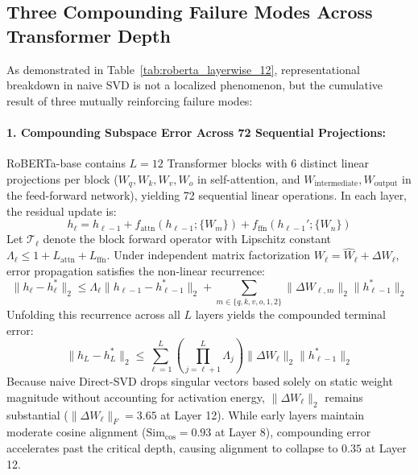 \documentclass{article}
\begin{document}
\subsection{Three Compounding Failure Modes Across Transformer Depth}
As demonstrated in Table~\ref{tab:roberta_layerwise_12}, representational breakdown in naive SVD is not a localized phenomenon, but the cumulative result of three mutually reinforcing failure modes:

\paragraph{1. Compounding Subspace Error Across 72 Sequential Projections:}
RoBERTa-base contains $L = 12$ Transformer blocks with 6 distinct linear projections per block ($W_q, W_k, W_v, W_o$ in self-attention, and $W_{\text{intermediate}}, W_{\text{output}}$ in the feed-forward network), yielding 72 sequential linear operations. In each layer, the residual update is:
\begin{equation}
    h_\ell = h_{\ell-1} + f_{\text{attn}}(h_{\ell-1}; \{W_m\}) + f_{\text{ffn}}(h_{\ell-1}'; \{W_n\})
\end{equation}
Let $\mathcal{T}_\ell$ denote the block forward operator with Lipschitz constant $\Lambda_\ell \le 1 + L_{\text{attn}} + L_{\text{ffn}}$. Under independent matrix factorization $W_\ell = \hat{W}_\ell + \Delta W_\ell$, error propagation satisfies the non-linear recurrence:
\begin{equation}
    \|h_\ell - h_\ell^*\|_2 \le \Lambda_\ell \|h_{\ell-1} - h_{\ell-1}^*\|_2 + \sum_{m \in \{q,k,v,o,1,2\}} \|\Delta W_{\ell, m}\|_2 \|h_{\ell-1}^*\|_2
\end{equation}
Unfolding this recurrence across all $L$ layers yields the compounded terminal error:
\begin{equation}
    \|h_L - h_L^*\|_2 \le \sum_{\ell=1}^L \left(\prod_{j=\ell+1}^L \Lambda_j\right) \|\Delta W_\ell\|_2 \|h_{\ell-1}^*\|_2
\end{equation}
Because naive Direct-SVD drops singular vectors based solely on static weight magnitude without accounting for activation energy, $\|\Delta W_\ell\|_2$ remains substantial ($\|\Delta W_\ell\|_F = 3.65$ at Layer 12). While early layers maintain moderate cosine alignment ($\text{Sim}_{\cos} = 0.93$ at Layer 8), compounding error accelerates past the critical depth, causing alignment to collapse to $0.35$ at Layer 12.
\end{document}
